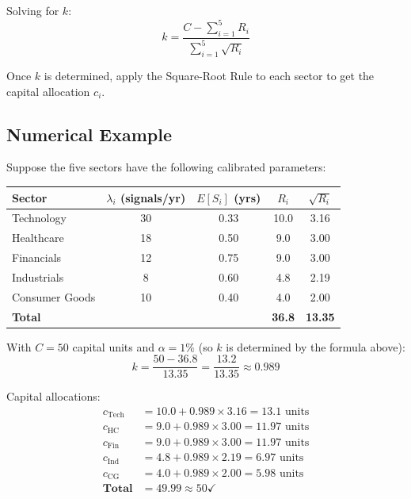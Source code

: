 \documentclass[11pt, oneside]{book}
\begin{document}
Solving for $k$:
\begin{equation}
    k = \frac{C - \sum_{i=1}^{5} R_i}{\sum_{i=1}^{5} \sqrt{R_i}}
\end{equation}

Once $k$ is determined, apply the Square-Root Rule to each sector to get the capital allocation $c_i$.

\subsection{Numerical Example}

Suppose the five sectors have the following calibrated parameters:

\begin{center}
\begin{tabular}{lcccc}
\toprule
\textbf{Sector} & $\lambda_i$ (signals/yr) & $E[S_i]$ (yrs) & $R_i$ & $\sqrt{R_i}$ \\
\midrule
Technology & 30 & 0.33 & 10.0 & 3.16 \\
Healthcare & 18 & 0.50 & 9.0 & 3.00 \\
Financials & 12 & 0.75 & 9.0 & 3.00 \\
Industrials & 8 & 0.60 & 4.8 & 2.19 \\
Consumer Goods & 10 & 0.40 & 4.0 & 2.00 \\
\midrule
\textbf{Total} & & & \textbf{36.8} & \textbf{13.35} \\
\bottomrule
\end{tabular}
\end{center}

With $C = 50$ capital units and $\alpha = 1\%$ (so $k$ is determined by the formula above):
\begin{equation}
    k = \frac{50 - 36.8}{13.35} = \frac{13.2}{13.35} \approx 0.989
\end{equation}

Capital allocations:
\begin{align*}
    c_{\text{Tech}} &= 10.0 + 0.989 \times 3.16 = 13.1 \text{ units} \\
    c_{\text{HC}} &= 9.0 + 0.989 \times 3.00 = 11.97 \text{ units} \\
    c_{\text{Fin}} &= 9.0 + 0.989 \times 3.00 = 11.97 \text{ units} \\
    c_{\text{Ind}} &= 4.8 + 0.989 \times 2.19 = 6.97 \text{ units} \\
    c_{\text{CG}} &= 4.0 + 0.989 \times 2.00 = 5.98 \text{ units} \\
    \textbf{Total} &= \mathbf{49.99} \approx 50 \checkmark
\end{align*}
\end{document}
